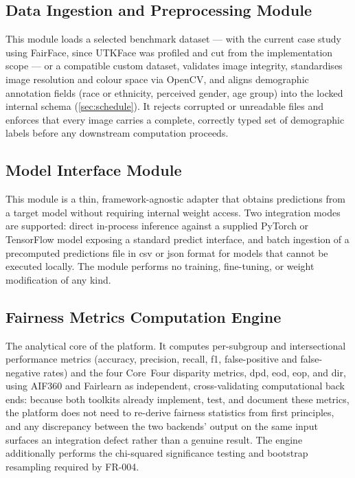 \subsection{Data Ingestion and Preprocessing Module}
This module loads a selected benchmark dataset --- with the current case study using FairFace, since UTKFace was profiled and cut from the implementation scope --- or a compatible custom dataset, validates image integrity, standardises image resolution and colour space via OpenCV, and aligns demographic annotation fields (race or ethnicity, perceived gender, age group) into the locked internal schema (\cref{sec:schedule}). It rejects corrupted or unreadable files and enforces that every image carries a complete, correctly typed set of demographic labels before any downstream computation proceeds.

\subsection{Model Interface Module}
This module is a thin, framework-agnostic adapter that obtains predictions from a target model without requiring internal weight access. Two integration modes are supported: direct in-process inference against a supplied PyTorch or TensorFlow model exposing a standard predict interface, and batch ingestion of a precomputed predictions file in \gls{csv} or \gls{json} format for models that cannot be executed locally. The module performs no training, fine-tuning, or weight modification of any kind.

\subsection{Fairness Metrics Computation Engine}
The analytical core of the platform. It computes per-subgroup and intersectional performance metrics (accuracy, precision, recall, \gls{f1}, false-positive and false-negative rates) and the four Core~Four disparity metrics, \gls{dpd}, \gls{eod}, \gls{eop}, and \gls{dir}, using AIF360 and Fairlearn as independent, cross-validating computational back ends: because both toolkits already implement, test, and document these metrics, the platform does not need to re-derive fairness statistics from first principles, and any discrepancy between the two backends' output on the same input surfaces an integration defect rather than a genuine result. The engine additionally performs the chi-squared significance testing and bootstrap resampling required by FR-004.


